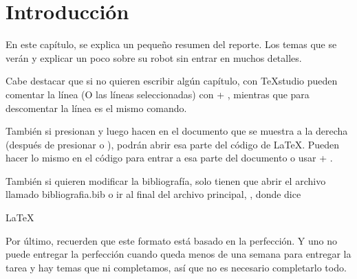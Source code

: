 \chapter{Introducción} \label{chap:introduccion}

En este capítulo, se explica un pequeño resumen del reporte. Los temas que se verán y explicar un poco sobre su robot sin entrar en muchos detalles.

Cabe destacar que si no quieren escribir algún capítulo, con \TeX studio pueden comentar la línea (O las líneas seleccionadas) con  + , mientras que para descomentar la línea es el mismo comando.

También si presionan  y luego hacen  en el documento que se muestra a la derecha (después de presionar  o ), podrán abrir esa parte del código de \LaTeX. Pueden hacer lo mismo en el código para entrar a esa parte del documento o usar  + .

También si quieren modificar la bibliografía, solo tienen que abrir el archivo llamado bibliografia.bib o ir al final del archivo principal, , donde dice

\begin{latexcode}{\LaTeX}
		
	
\end{latexcode}

Por último, recuerden que este formato está basado en la perfección. Y uno no puede entregar la perfección cuando queda menos de una semana para entregar la tarea y hay temas que ni completamos, así que no es necesario completarlo todo.